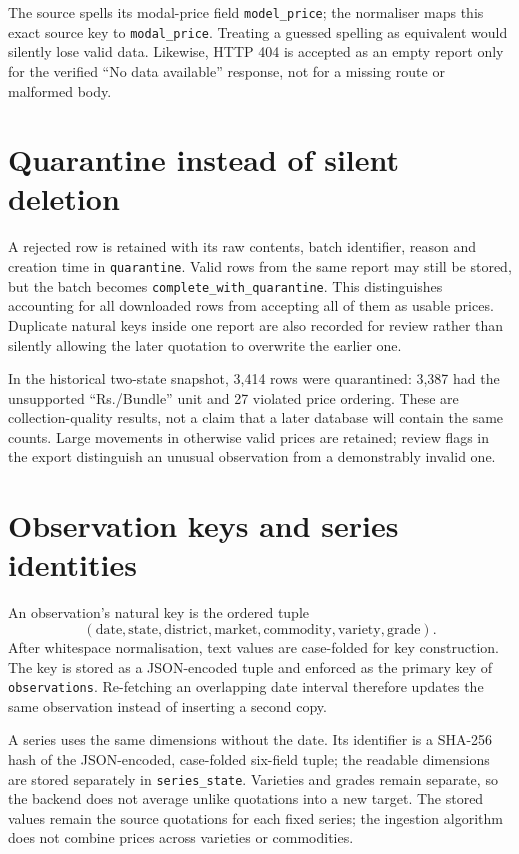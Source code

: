 \documentclass[12pt,a4paper,oneside]{report}
\numberwithin{equation}{chapter}
\numberwithin{figure}{chapter}
\numberwithin{table}{chapter}
\theoremstyle{definition}
\begin{document}
The source spells its modal-price field \texttt{model\_price}; the normaliser maps this exact source key to \texttt{modal\_price}. Treating a guessed spelling as equivalent would silently lose valid data. Likewise, HTTP 404 is accepted as an empty report only for the verified ``No data available'' response, not for a missing route or malformed body.

\section{Quarantine instead of silent deletion}
A rejected row is retained with its raw contents, batch identifier, reason and creation time in \texttt{quarantine}. Valid rows from the same report may still be stored, but the batch becomes \texttt{complete\_with\_quarantine}. This distinguishes accounting for all downloaded rows from accepting all of them as usable prices. Duplicate natural keys inside one report are also recorded for review rather than silently allowing the later quotation to overwrite the earlier one.

In the historical two-state snapshot, 3,414 rows were quarantined: 3,387 had the unsupported ``Rs./Bundle'' unit and 27 violated price ordering. These are collection-quality results, not a claim that a later database will contain the same counts. Large movements in otherwise valid prices are retained; review flags in the export distinguish an unusual observation from a demonstrably invalid one.

\section{Observation keys and series identities}
An observation's natural key is the ordered tuple
\[
(\text{date},\text{state},\text{district},\text{market},
 \text{commodity},\text{variety},\text{grade}).
\]
After whitespace normalisation, text values are case-folded for key construction. The key is stored as a JSON-encoded tuple and enforced as the primary key of \texttt{observations}. Re-fetching an overlapping date interval therefore updates the same observation instead of inserting a second copy.

A series uses the same dimensions without the date. Its identifier is a SHA-256 hash of the JSON-encoded, case-folded six-field tuple; the readable dimensions are stored separately in \texttt{series\_state}. Varieties and grades remain separate, so the backend does not average unlike quotations into a new target. The stored values remain the source quotations for each fixed series; the ingestion algorithm does not combine prices across varieties or commodities.
\end{document}
